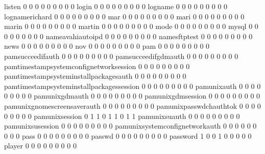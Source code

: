 \documentclass[compress,8pt]{beamer}
\begin{document}
\begin{frame}
\begin{Schunk}
  listen                                     0   0   0   0   0   0   0   0   0
  login                                      0   0   0   0   0   0   0   0   0
  logname                                    0   0   0   0   0   0   0   0   0
  lognamerichard                             0   0   0   0   0   0   0   0   0
  mar                                        0   0   0   0   0   0   0   0   0
  mari                                       0   0   0   0   0   0   0   0   0
  marin                                      0   0   0   0   0   0   0   0   0
  martin                                     0   0   0   0   0   0   0   0   0
  mode                                       0   0   0   0   0   0   0   0   0
  mysql                                      0   0   0   0   0   0   0   0   0
  nameavahiautoipd                           0   0   0   0   0   0   0   0   0
  namesftptest                               0   0   0   0   0   0   0   0   0
  news                                       0   0   0   0   0   0   0   0   0
  nov                                        0   0   0   0   0   0   0   0   0
  pam                                        0   0   0   0   0   0   0   0   0
  pamsucceedifauth                           0   0   0   0   0   0   0   0   0
  pamsucceedifgdmauth                        0   0   0   0   0   0   0   0   0
  pamtimestampsystemconfignetworksession     0   0   0   0   0   0   0   0   0
  pamtimestampsysteminstallpackagesauth      0   0   0   0   0   0   0   0   0
  pamtimestampsysteminstallpackagessession   0   0   0   0   0   0   0   0   0
  pamunixauth                                0   0   0   0   0   0   0   0   0
  pamunixgdmauth                             0   0   0   0   0   0   0   0   0
  pamunixgdmsession                          0   0   0   0   0   0   0   0   0
  pamunixgnomescreensaverauth                0   0   0   0   0   0   0   0   0
  pamunixpasswdchauthtok                     0   0   0   0   0   0   0   0   0
  pamunixsession                             0   1   1   0   1   1   0   1   1
  pamunixsuauth                              0   0   0   0   0   0   0   0   0
  pamunixsusession                           0   0   0   0   0   0   0   0   0
  pamunixsystemconfignetworkauth             0   0   0   0   0   0   0   0   0
  pass                                       0   0   0   0   0   0   0   0   0
  passwd                                     0   0   0   0   0   0   0   0   0
  password                                   1   0   0   1   0   0   0   0   0
  player                                     0   0   0   0   0   0   0   0   0

\end{Schunk}
\end{frame}
\end{document}
